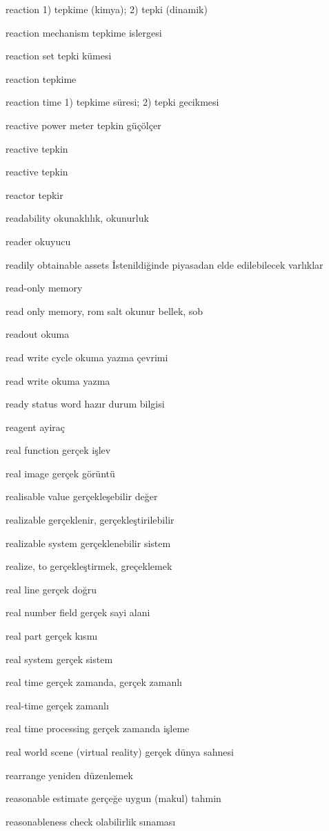 \documentclass[12pt,fleqn]{article}\usepackage{../../common}
\begin{document}
reaction 1) tepkime (kimya); 2) tepki (dinamik)

reaction mechanism tepkime islergesi

reaction set tepki kümesi

reaction tepkime

reaction time 1) tepkime süresi; 2) tepki gecikmesi

reactive power meter tepkin güçölçer

reactive tepkin

reactive tepkin

reactor tepkir

readability okunaklılık, okunurluk

reader okuyucu

readily obtainable assets İstenildiğinde piyasadan elde edilebilecek varlıklar

read-only memory

read only memory, rom salt okunur bellek, sob

readout okuma

read write cycle okuma yazma çevrimi

read write okuma yazma

ready status word hazır durum bilgisi

reagent ayiraç

real function gerçek işlev

real image gerçek görüntü

realisable value gerçekleşebilir değer

realizable gerçeklenir, gerçekleştirilebilir

realizable system gerçeklenebilir sistem

realize, to gerçekleştirmek, greçeklemek

real line gerçek doğru

real number field gerçek sayi alani

real part gerçek kısmı

real system gerçek sistem

real time gerçek zamanda, gerçek zamanlı

real-time gerçek zamanlı

real time processing gerçek zamanda işleme

real world scene (virtual reality) gerçek dünya sahnesi

rearrange yeniden düzenlemek

reasonable estimate gerçeğe uygun (makul) tahmin

reasonableness check olabilirlik sınaması
\end{document}
